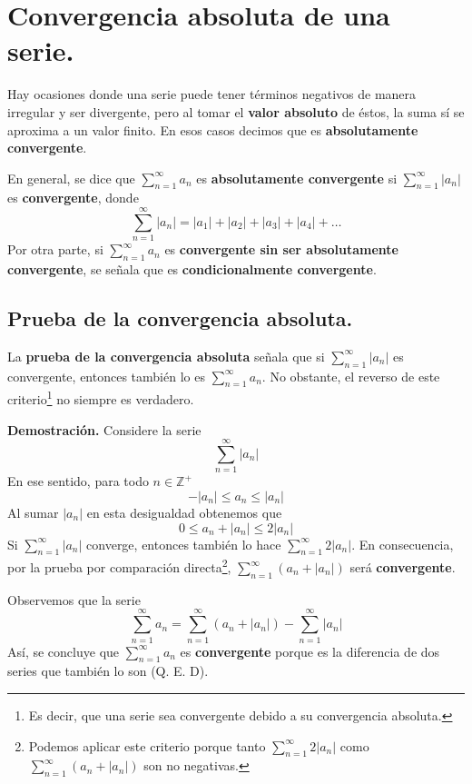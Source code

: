 \documentclass[12pt]{article}
\begin{document}
\section{Convergencia absoluta de una serie.}

Hay ocasiones donde una serie puede tener términos negativos de manera irregular y ser divergente, pero al tomar el \textbf{valor absoluto} de éstos, la suma sí se aproxima a un valor finito. En esos casos decimos que es \textbf{absolutamente convergente}.

En general, se dice que $\sum_{n = 1}^{\infty} a_{n}$ es \textbf{absolutamente convergente} si $\sum_{n = 1}^{\infty} |a_{n}|$ es \textbf{convergente}, donde
\[
  \sum_{n = 1}^{\infty} |a_{n}| = |a_{1}| + |a_{2}| + |a_{3}| + |a_{4}| + \ldots
\]
Por otra parte, si $\sum_{n = 1}^{\infty} a_{n}$ es \textbf{convergente sin ser absolutamente convergente}, se señala que es \textbf{condicionalmente convergente}.

\subsection{Prueba de la convergencia absoluta.}

La \textbf{prueba de la convergencia absoluta} señala que si $\sum_{n = 1}^{\infty} |a_{n}|$ es convergente, entonces también lo es $\sum_{n = 1}^{\infty} a_{n}$. No obstante, el reverso de este criterio\footnote{Es decir, que una serie sea convergente debido a su convergencia absoluta.} no siempre es verdadero.

\textbf{Demostración.} Considere la serie
\[
  \sum_{n = 1}^{\infty} |a_{n}|
\]
En ese sentido, para todo $n \in \mathbb{Z}^{+}$
\[
  -|a_{n}| \leq a_{n} \leq |a_{n}|
\]
Al sumar $|a_{n}|$ en esta desigualdad obtenemos que
\[
  0 \leq a_{n} + |a_{n}| \leq 2|a_{n}|
\]
Si $\sum_{n = 1}^{\infty} |a_{n}|$ converge, entonces también lo hace $\sum_{n = 1}^{\infty} 2|a_{n}|$. En consecuencia, por la prueba por comparación directa\footnote{Podemos aplicar este criterio porque tanto $\sum_{n = 1}^{\infty} 2|a_{n}|$ como $\sum_{n = 1}^{\infty} (a_{n} + |a_{n}|)$ son no negativas.}, $\sum_{n = 1}^{\infty} (a_{n} + |a_{n}|)$ será \textbf{convergente}.

Observemos que la serie
\[
  \sum_{n = 1}^{\infty} a_{n} = \sum_{n = 1}^{\infty} (a_{n} + |a_{n}|) - \sum_{n = 1}^{\infty} |a_{n}|
\]
Así, se concluye que $\sum_{n = 1}^{\infty} a_{n}$ es \textbf{convergente} porque es la diferencia de dos series que también lo son (Q. E. D).
\end{document}
